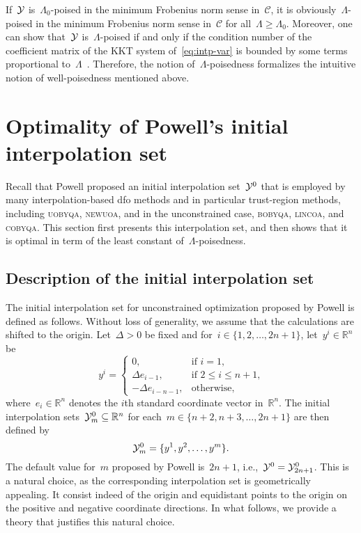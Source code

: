 \documentclass[draft]{article}
\numberwithin{equation}{section}
\theoremstyle{definition}
\theoremstyle{plain}
\newcommand*{\R}{\mathbb{R}}
\newcommand*{\set}[2][]{#1\{#2#1\}}
\newcommand*{\solvername}[1]{\textsc{#1}\xspace}
\newcommand*{\xpt}[1][]{\mathcal{Y}\ifblank{#1}{}{^{#1}}}
\begin{document}
If~$\xpt$ is~$\Lambda_0$-poised in the minimum Frobenius norm sense in~$\mathcal{C}$, it is obviously~$\Lambda$-poised in the minimum Frobenius norm sense in~$\mathcal{C}$ for all~$\Lambda \ge \Lambda_0$.
Moreover, one can show that~$\xpt$ is~$\Lambda$-poised if and only if the condition number of the coefficient matrix of the KKT system of~\eqref{eq:intp-var} is bounded by some terms proportional to~$\Lambda$~\cite[Theorem~5.8]{Conn_Scheinberg_Vicente_2009}.
Therefore, the notion of~$\Lambda$-poisedness formalizes the intuitive notion of well-poisedness mentioned above.

\section{Optimality of Powell's initial interpolation set}
\label{sec:main-result}

Recall that Powell proposed an initial interpolation set~$\xpt[0]$ that is employed by many interpolation-based \gls{dfo} methods and in particular trust-region methods, including \solvername{uobyqa}, \solvername{newuoa}, and in the unconstrained case, \solvername{bobyqa}, \solvername{lincoa}, and \solvername{cobyqa}.
This section first presents this interpolation set, and then shows that it is optimal in term of the least constant of~$\Lambda$-poisedness.

\subsection{Description of the initial interpolation set}

The initial interpolation set for unconstrained optimization proposed by Powell is defined as follows.
Without loss of generality, we assume that the calculations are shifted to the origin.
Let~$\Delta > 0$ be fixed and for~$i \in \set{1, 2, \dots, 2n + 1}$, let~$y^i \in \R^n$ be
\begin{equation}
    \label{eq:set-def}
    y^i =
    \begin{cases}
        0,                      & \text{if~$i = 1$,}\\
        \Delta e_{i - 1},       & \text{if~$2 \le i \le n + 1$,}\\
        -\Delta e_{i - n - 1},  & \text{otherwise},
    \end{cases}
\end{equation}
where~$e_i \in \R^n$ denotes the $i$th standard coordinate vector in~$\R^n$.
The initial interpolation sets~$\xpt[0]_m \subseteq \R^n$ for each~$m \in \set{n + 2, n + 3, \dots, 2n + 1}$ are then defined by
\begin{equation}
    \label{eq:set-def-m}
    \xpt[0]_m = \set{y^1, y^2, \dots, y^m}.
\end{equation}
The default value for~$m$ proposed by Powell is~$2n + 1$, i.e.,~$\xpt[0] = \xpt[0]_{2n + 1}$.
This is a natural choice, as the corresponding interpolation set is geometrically appealing.
It consist indeed of the origin and equidistant points to the origin on the positive and negative coordinate directions.
In what follows, we provide a theory that justifies this natural choice.
\end{document}
